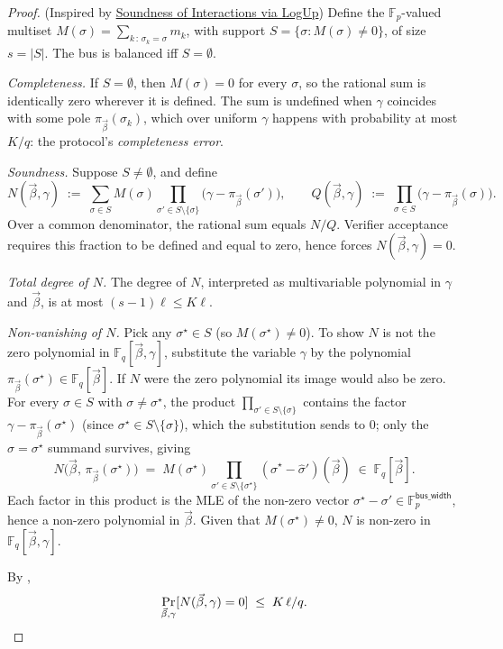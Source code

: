 \documentclass{article}
\theoremstyle{definition}
\newcommand{\Fp}{\mathbb F_p}
\newcommand{\Fq}{\mathbb F_q}
\begin{document}
\begin{proof}
(Inspired by \href{https://github.com/openvm-org/stark-backend/blob/main/docs/Soundness_of_Interactions_via_LogUp.pdf}{Soundness of Interactions via LogUp})
Define the $\Fp$-valued multiset $M(\sigma) = \sum_{k \,:\, \sigma_k = \sigma} m_k$, with support $S = \{\sigma : M(\sigma) \neq 0\}$, of size $s = |S|$. The bus is balanced iff $S = \emptyset$.

\emph{Completeness.} If $S = \emptyset$, then $M(\sigma) = 0$ for every $\sigma$, so the rational sum is identically zero wherever it is defined. The sum is undefined when $\gamma$ coincides with some pole $\pi_{\vec\beta}(\sigma_k)$, which over uniform $\gamma$ happens with probability at most $K/q$:  the protocol's \emph{completeness error}.

\emph{Soundness.} Suppose $S \neq \emptyset$, and define
\[
N(\vec\beta, \gamma) \;:=\; \sum_{\sigma \in S} M(\sigma) \prod_{\sigma' \in S \setminus \{\sigma\}}\!\big(\gamma - \pi_{\vec\beta}(\sigma')\big), \qquad Q(\vec\beta, \gamma) \;:=\; \prod_{\sigma \in S}\!\big(\gamma - \pi_{\vec\beta}(\sigma)\big).
\]
Over a common denominator, the rational sum equals $N/Q$. Verifier acceptance requires this fraction to be defined and equal to zero, hence forces $N(\vec\beta, \gamma) = 0$.

\emph{Total degree of $N$.} The degree of $N$, interpreted as multivariable polynomial in $\gamma$ and $\vec\beta$, is at most $(s-1)\ell \leq K \ell$.

\emph{Non-vanishing of $N$.} Pick any $\sigma^\star \in S$ (so $M(\sigma^\star) \neq 0$). To show $N$ is not the zero polynomial in $\Fq[\vec\beta, \gamma]$, substitute the variable $\gamma$ by the polynomial $\pi_{\vec\beta}(\sigma^\star) \in \Fq[\vec\beta]$. If $N$ were the zero polynomial its image would also be zero. For every $\sigma \in S$ with $\sigma \neq \sigma^\star$, the product $\prod_{\sigma' \in S \setminus \{\sigma\}}$ contains the factor $\gamma - \pi_{\vec\beta}(\sigma^\star)$ (since $\sigma^\star \in S \setminus \{\sigma\}$), which the substitution sends to $0$; only the $\sigma = \sigma^\star$ summand survives, giving
$$
N\big(\vec\beta,\, \pi_{\vec\beta}(\sigma^\star)\big) \;=\; M(\sigma^\star) \prod_{\sigma' \in S \setminus \{\sigma^\star\}} (\hat\sigma^\star - \hat\sigma')(\vec\beta) \;\in\; \Fq[\vec\beta].
$$
Each factor in this product is the MLE of the non-zero vector $\sigma^\star - \sigma' \in \Fp^{\textsf{bus\_width}}$, hence a non-zero polynomial in $\vec\beta$. Given that $M(\sigma^\star) \neq 0$, $N$ is non-zero in $\Fq[\vec\beta, \gamma]$.

By ,
\[
\Pr_{\vec\beta, \gamma}[N(\vec\beta, \gamma) = 0] \;\leq\; K\,\ell/q. \qedhere
\]
\end{proof}
\end{document}
